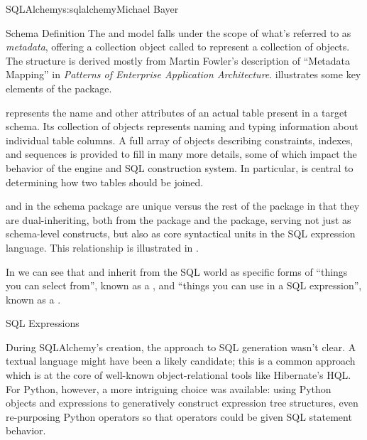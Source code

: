 \begin{aosachapter}{SQLAlchemy}{s:sqlalchemy}{Michael Bayer}
\begin{aosasect1}{Schema Definition}
The  and  model falls under the scope of what's
referred to as \emph{metadata}, offering a collection object called  to represent
a collection of  objects.  The structure is derived
mostly from Martin Fowler's description of ``Metadata Mapping'' in
\emph{Patterns of Enterprise Application Architecture}. 
 illustrates
some key elements of the  package.


 represents the name and other attributes of an actual table
present in a target schema.  Its collection of  objects
represents naming and typing information about individual table columns.
A full array of objects describing constraints, indexes, and sequences
is provided to fill in many more details, some of which impact the
behavior of the engine and SQL construction system.  In particular, 
is central to determining how two tables should be joined.

 and  in the schema package are unique versus the rest of the
package in that they are dual-inheriting, both from the  package and
the  package, serving not just as schema-level
constructs, but also as core syntactical units in the SQL expression language.
This relationship is illustrated in .


In  we can see that  and  inherit from the SQL world as
specific forms of ``things you can select from'', known as a ,
and ``things you can use in a SQL expression'', known as a .

\end{aosasect1}

\begin{aosasect1}{SQL Expressions}

During SQLAlchemy's creation, the
approach to SQL generation wasn't clear. A textual
language might have been a likely candidate; this is a common
approach which is at the core of well-known object-relational tools
like Hibernate's HQL. For Python, however, a more intriguing
choice was available: using Python objects and expressions
to generatively construct expression tree structures, even
re-purposing Python operators so that operators
could be given SQL statement behavior.


\end{aosasect1}
\end{aosachapter}
